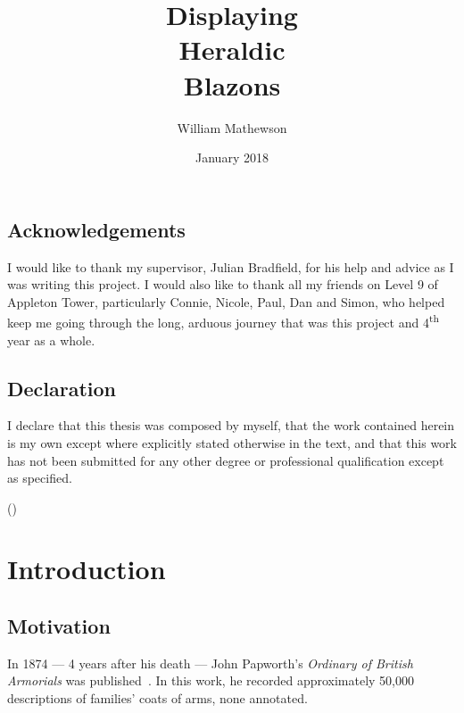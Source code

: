 \documentclass[nobib, a4paper, twoside, justified]{tufte-book}
\title{Displaying\\Heraldic\\Blazons}
\author{William Mathewson}
\date{January 2018}
\begin{document}
\frontmatter

\maketitlepage{}


\begin{publicationmeta}
  \section*{Acknowledgements}
  I would like to thank my supervisor, Julian Bradfield, for his help and advice as I was writing
  this project. I would also like to thank all my friends on Level 9 of Appleton Tower,
  particularly Connie, Nicole, Paul, Dan and Simon, who helped keep me going through the long,
  arduous journey that was this project and 4\textsuperscript{th} year as a whole.

  \section*{Declaration}
  I declare that this thesis was composed by myself,
  that the work contained herein is my own
  except where explicitly stated otherwise in the text,
  and that this work has not been submitted for any other degree or
  professional qualification except as specified.\par
  ({\textit{\thanklessauthor}})
\end{publicationmeta}

\tableofcontents


\mainmatter%

\chapter{Introduction}%
\label{cha:introduction}

\section{Motivation}\label{sec:motivation}

In 1874 --- 4 years after his death --- John Papworth's \textit{Ordinary of British Armorials} was
published~\autocite{collins_1942}. In this work, he recorded approximately 50,000 descriptions of
families' coats of arms, none annotated.
\end{document}
